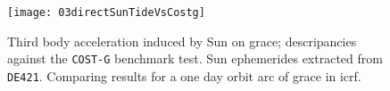 \begin{figure}
  \centering
  \texttt{[image: 03directSunTideVsCostg]}
  \caption{Third body acceleration induced by Sun on \gls{grace}; descripancies 
   against the \texttt{COST-G} benchmark test. Sun ephemerides extracted from \texttt{DE421}.
   Comparing results for a one day orbit arc of \gls{grace} in \gls{icrf}.}
  \label{fig:directSunTideIcrfVsCostg}
\end{figure}

